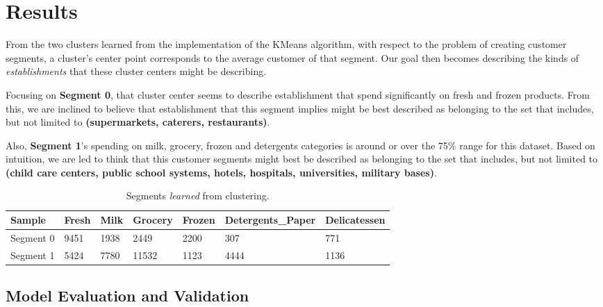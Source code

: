 \documentclass[twoside,openright,titlepage,numbers=noenddot,headinclude,%
               footinclude=true,cleardoublepage=empty,abstractoff,BCOR=5mm,%
               paper=a4,fontsize=11pt,ngerman,american]{scrreprt}
\numberwithin{theorem}{chapter}
\numberwithin{definition}{chapter}
\numberwithin{algorithm}{chapter}
\numberwithin{figure}{chapter}
\numberwithin{table}{chapter}
\numberwithin{equation}{chapter}
\begin{document}
\chapter*{Results}

From the two clusters learned from the implementation of the KMeans algorithm, with respect to the problem of creating customer segments, a cluster's center point corresponds to the average customer of that segment. Our goal then becomes describing the kinds of \emph{establishments} that these cluster centers might be describing.

Focusing on \textbf{Segment 0}, that cluster center seems to describe establishment that spend significantly on fresh and frozen products. From this, we are inclined to believe that establishment that this segment implies might be best described as belonging to the set that includes, but not limited to \textbf{(supermarkets, caterers, restaurants)}.


Also, \textbf{Segment 1}'s spending on milk, grocery, frozen and detergents categories is around or over the 75\% range for this dataset. Based on intuition, we are led to think that this customer segments might best be described as belonging to the set that includes, but not limited to  \textbf{(child care centers, public school systems, hotels, hospitals, universities, military bases)}. 


\begin{table}[!htbp]
  \begin{center}
  \caption{Segments \emph{learned} from clustering.}
    \begin{tabular}{ |l|l|l|l|l|l|l| } 
    \hline
    Sample & Fresh & Milk & Grocery & Frozen & Detergents\_Paper & Delicatessen\\[1ex]

    \hline
    
      Segment 0 &9451  &1938  &2449  &2200  &307 &771 \\
      Segment 1 &5424  &7780  &11532 &1123  &4444  &1136  \\
      
    \hline
    \end{tabular}
    \label{tableSegments}
  \end{center}
\end{table}

\section*{Model Evaluation and Validation}
\end{document}
